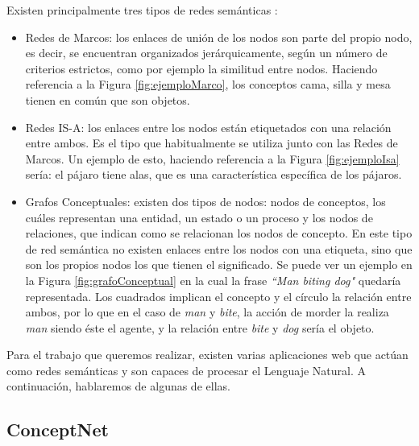 Existen principalmente tres tipos de redes semánticas \citep{tiposRedesSemanticas}:
\begin{itemize}
	\item Redes de Marcos: los enlaces de unión de los nodos son parte del propio nodo, es decir, se encuentran organizados jerárquicamente, según un número de criterios estrictos, como por ejemplo la similitud entre nodos. Haciendo referencia a la Figura \ref{fig:ejemploMarco}, los conceptos cama, silla y mesa tienen en común que son objetos.
	\item Redes IS-A: los enlaces entre los nodos están etiquetados con una relación entre ambos. Es el tipo que habitualmente se utiliza junto con las Redes de Marcos. Un ejemplo de esto, haciendo referencia a la Figura \ref{fig:ejemploIsa} sería: el pájaro tiene alas, que es una característica específica de los pájaros.
	\item Grafos Conceptuales: existen dos tipos de nodos: nodos de conceptos, los cuáles representan una entidad, un estado o un proceso y los nodos de relaciones, que indican como se relacionan los nodos de concepto. En este tipo de red semántica no existen enlaces entre los nodos con una etiqueta, sino que son los propios nodos los que tienen el significado. Se puede ver un ejemplo en la Figura \ref{fig:grafoConceptual} \citep{osti_5673179} en la cual la frase \textit{``Man biting dog"} quedaría representada. Los cuadrados implican el concepto y el círculo la relación entre ambos, por lo que en el caso de \textit{man} y \textit{bite}, la acción de morder la realiza \textit{man} siendo éste el agente, y la relación entre \textit{bite} y \textit{dog} sería el objeto.
\end{itemize}
Para el trabajo que queremos realizar, existen varias aplicaciones web que actúan como redes semánticas y son capaces de procesar el Lenguaje Natural.  A continuación, hablaremos de algunas de ellas.

\subsection{ConceptNet} 
\label{cap:subsec:concepnet}

